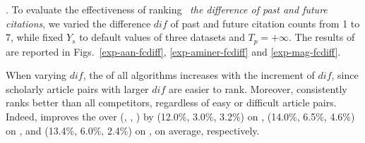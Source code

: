 .
To evaluate the effectiveness of ranking \wrt\ {\em the difference of past and future citations},
we varied the difference $dif$ of past and future citation counts from 1 to 7, while fixed $Y_s$ to default values of three datasets and $T_p=+\infty$. The results of \PairAcc are reported in Figs.~\ref{exp-aan-fcdiff}, \ref{exp-aminer-fcdiff} and \ref{exp-mag-fcdiff}.

When varying $dif$, the \PairAcc of all algorithms increases with the increment of $dif$, since scholarly article pairs with larger $dif$ are easier to rank. Moreover, \ensemblerank consistently ranks better than all competitors, regardless of easy or difficult article pairs. Indeed, \ensemblerank improves the \PairAcc over (\pagerank, \futurerank, \hhgrank) by (12.0\%, 3.0\%, 3.2\%) on \aan, (14.0\%, 6.5\%, 4.6\%) on \aminer, and (13.4\%, 6.0\%, 2.4\%) on \magdata, on average, respectively.




